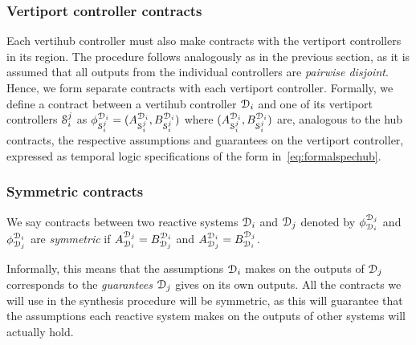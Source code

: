\subsubsection{Vertiport controller contracts}
Each vertihub controller must also make contracts with the vertiport controllers in its region. The procedure follows analogously as in the previous section, as it is assumed that all outputs from the individual controllers are \emph{pairwise disjoint}. Hence, we form separate contracts with each vertiport controller. Formally, we define a contract between a vertihub controller $\mathcal{D}_i$ and one of its vertiport controllers $\mathcal{S}_i^j$ as $ \phi_{\mathcal{S}^j_i}^{\mathcal{D}_i} = (A_{\mathcal{S}_i^j}^{\mathcal{D}_i},B_{\mathcal{S}_i^j}^{\mathcal{D}_i})$ where $(A_{\mathcal{S}_i^j}^{\mathcal{D}_i},B_{\mathcal{S}_i^j}^{\mathcal{D}_i})$ are, analogous to the hub contracts, the respective assumptions and guarantees on the vertiport controller, expressed as temporal logic specifications of the form in~\eqref{eq:formalspechub}. 

\subsubsection{Symmetric contracts}
We say contracts between two reactive systems $\mathcal{D}_i$ and $\mathcal{D}_j$ denoted by $\phi_{\mathcal{D}_i}^{\mathcal{D}_j}  $ and $\phi_{\mathcal{D}_j}^{\mathcal{D}_i}$ are \emph{symmetric} if $A_{\mathcal{D}_i}^{\mathcal{D}_j} = B_{\mathcal{D}_j}^{\mathcal{D}_i}$ and $A_{\mathcal{D}_j}^{\mathcal{D}_i} = B_{\mathcal{D}_i}^{\mathcal{D}_j}$. 

Informally, this means that the assumptions $\mathcal{D}_i$ makes on the outputs of $\mathcal{D}_j$ corresponds to the \emph{guarantees} $\mathcal{D}_j$ gives on its own outputs. All the contracts we will use in the synthesis procedure will be symmetric, as this will guarantee that the assumptions each reactive system makes on the outputs of other systems will actually hold. 


